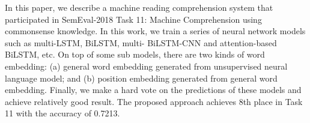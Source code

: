 In this paper, we describe a machine reading comprehension system that participated in SemEval-2018 Task 11: Machine Comprehension using commonsense knowledge. In this work, we train a series of neural network models such as multi-LSTM, BiLSTM, multi- BiLSTM-CNN and attention-based BiLSTM, etc. On top of some sub models, there are two kinds of word embedding: (a) general word embedding generated from unsupervised neural language model; and (b) position embedding generated from general word embedding. Finally, we make a hard vote on the predictions of these models and achieve relatively good result. The proposed approach achieves 8th place in Task 11 with the accuracy of 0.7213.

